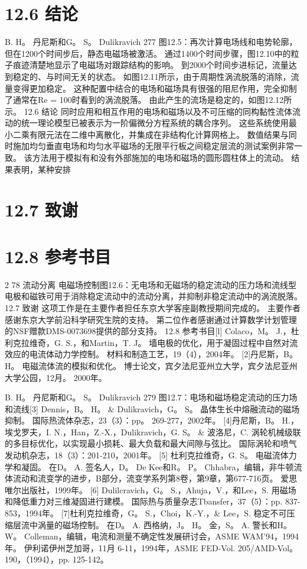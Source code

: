 \documentclass[UTF8,11pt,a4paper,openany,fontset=fandol]{ctexbook}
\begin{document}
\section{12.6 结论}
B. H。 丹尼斯和G。 S。 Dulikravich 277 图12.5：再次计算电场线和电势轮廓，但在1200个时间步后，静态电磁场被激活。 通过1400个时间步骤，图12.10中的粒子痕迹清楚地显示了电磁场对跟踪结构的影响。 到2000个时间步进标记，流量达到稳定的、与时间无关的状态。 如图12.11所示，由于周期性涡流脱落的消除，流量变得更加稳定。 这种配置中结合的电场和磁场具有很强的阻尼作用，完全抑制了通常在Re = 100时看到的涡流脱落。 由此产生的流场是稳定的，如图12.12所示。 12.6 结论 同时应用和相互作用的电场和磁场以及不可压缩的同构黏性流体流动的统一理论模型已被表示为一阶偏微分方程系统的耦合序列。 这些系统使用最小二乘有限元法在二维中离散化，并集成在非结构化计算网格上。 数值结果与同时施加均匀垂直电场和均匀水平磁场的无限平行板之间稳定层流的测试案例非常一致。 该方法用于模拟有和没有外部施加的电场和磁场的圆形圆柱体上的流动。 结果表明，某种安排

\section{12.7 致谢}
\section{12.8 参考书目}
2 78 流动分离 电磁场控制图12.6：无电场和无磁场的稳定流动的压力场和流线型电极和磁铁可用于消除稳定流动中的流动分离，并抑制非稳定流动中的涡流脱落。 12.7 致谢 这项工作是在主要作者担任东京大学客座副教授期间完成的。 主要作者感谢东京大学前沿科学研究生院的支持。 第二位作者感谢通过计算数学计划管理的NSF赠款DMS-0073698提供的部分支持。 12.8 参考书目[l] Colaco，M。 J.，杜利克拉维奇，G. S.，和Martin，T. J。 墙电极的优化，用于凝固过程中自然对流效应的电流体动力学控制。 材料和制造工艺，19（4），2004年。 [2]丹尼斯，B。 H。 电磁流体流的模拟和优化。 博士论文，宾夕法尼亚州立大学，宾夕法尼亚州大学公园，12月。 2000年。

B. H。 丹尼斯和G。 S。 Dulikravich 279 图12.7：电场和磁场稳定流动的压力场和流线[3] Dennis，B。 H。 \& Dulikravich，G。 S。 晶体生长中熔融流动的磁场抑制。 国际热流体杂志，23（3）：pp。 269-277，2002年。 [4]丹尼斯，B。 H.，埃戈罗夫，I. N.，Han，Z.-X.，Dulikravich，G. S。 \& 波洛尼，C. 涡轮机械级联的多目标优化，以实现最小损耗、最大负载和最大间隙与弦比。 国际涡轮和喷气发动机杂志，18（3）：201-210，2001年。 [5] 杜利克拉维奇，G. S。 电磁流体力学和凝固。 在D。 A. 签名人，D。 De Kee和R。 P。 Chhabra，编辑，非牛顿流体流动和流变学的进步，B部分，流变学系列第8卷，第9章，第677-716页。 爱思唯尔出版社，1999年。 [6] Dulilcravich，G。 S.，Ahuja，V.，和Lee，S. 用磁场和降低重力对三维凝固进行建模。 国际热与质量杂志Tbansfer，37（5）：pp. 837-853，1994年。 [7]杜利克拉维奇，G。 S.，Choi，K.-Y.，\& Lee，S. 稳定不可压缩层流中涡量的磁场控制。 在D。 A. 西格纳，J。 H。 金，S。 A. 警长和H。 W。 Colleman，编辑，电流和测量不确定性发展研讨会，ASME WAM'94，1994年。 伊利诺伊州芝加哥，11月 6-11，1994年，ASME FED-Vol. 205/AMD-Vol。 190，（1994），pp. 125-142。
\end{document}
